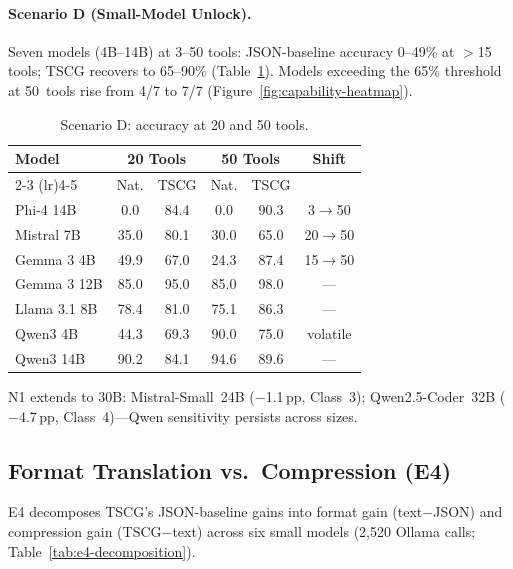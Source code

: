 \paragraph{Scenario D (Small-Model Unlock).}
Seven models (4B--14B) at 3--50 tools: JSON-baseline accuracy 0--49\% at $>$15 tools; TSCG recovers to 65--90\% (Table~\ref{tab:small-model}).
Models exceeding the 65\% threshold at 50~tools rise from 4/7 to 7/7 (Figure~\ref{fig:capability-heatmap}).

\begin{table}[h]
\centering
\small
\caption{Scenario D: accuracy at 20 and 50 tools.}
\label{tab:small-model}
\begin{tabular}{lccccc}
\toprule
\textbf{Model} & \multicolumn{2}{c}{\textbf{20 Tools}} & \multicolumn{2}{c}{\textbf{50 Tools}} & \textbf{Shift} \\
\cmidrule(lr){2-3} \cmidrule(lr){4-5}
& Nat. & TSCG & Nat. & TSCG & \\
\midrule
Phi-4 14B    & 0.0  & 84.4 & 0.0  & 90.3 & 3$\to$50  \\
Mistral 7B   & 35.0 & 80.1 & 30.0 & 65.0 & 20$\to$50 \\
Gemma 3 4B   & 49.9 & 67.0 & 24.3 & 87.4 & 15$\to$50 \\
Gemma 3 12B  & 85.0 & 95.0 & 85.0 & 98.0 & ---  \\
Llama 3.1 8B & 78.4 & 81.0 & 75.1 & 86.3 & ---  \\
Qwen3 4B     & 44.3 & 69.3 & 90.0 & 75.0 & volatile  \\
Qwen3 14B    & 90.2 & 84.1 & 94.6 & 89.6 & --- \\
\bottomrule
\end{tabular}
\end{table}



N1 extends to 30B: Mistral-Small~24B ($-$1.1\,pp, Class~3); Qwen2.5-Coder~32B ($-$4.7\,pp, Class~4)---Qwen sensitivity persists across sizes.

\subsection{Format Translation vs.\ Compression (E4)}
\label{sec:format-effect}

E4 decomposes TSCG's JSON-baseline gains into format gain (text$-$JSON) and compression gain (TSCG$-$text) across six small models (2{,}520 Ollama calls; Table~\ref{tab:e4-decomposition}).


